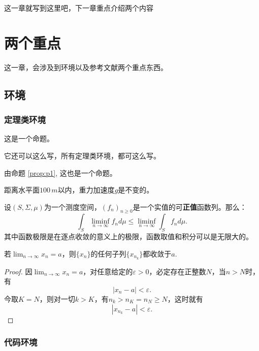 这一章就写到这里吧，下一章重点介绍两个内容

\chapter{两个重点}
这一章，会涉及到环境以及参考文献两个重点东西。

\section{环境}
\subsection{定理类环境}

\begin{proposition}\label{prop:p1}
这是一个命题。
\end{proposition}

它还可以这么写，所有定理类环境，都可这么写。

\begin{proposition}[命题名]
由命题 \ref{prop:p1}, 这也是一个命题。
\end{proposition}

\begin{assumption}
距离水平面$100\,m$以内，重力加速度$g$是不变的。
\end{assumption}

\begin{lemma}[法图引理]
设$(S,\Sigma,\mu)$为一个测度空间，$(f_n)_{n\geq 0}$是一个实值的可\textbf{正值}函数列。那么：
\[
\int_S \liminf_{n\rightarrow \infty} f_n d\mu \leqslant \liminf_{n\rightarrow \infty} \int_S f_n d\mu.
\]
其中函数极限是在逐点收敛的意义上的极限，函数取值和积分可以是无限大的。
\end{lemma}

\begin{theorem}
若$\lim_{n\rightarrow \infty} x_n = a$，则$\{x_n\}$的任何子列$\{x_{n_k}\}$都收敛于$a$.
\end{theorem}
\begin{proof}
因$\lim_{n\rightarrow \infty} x_n = a$，对任意给定的$\varepsilon > 0$，必定存在正整数$N$，当$n>N$时，有
\[
|x_n-a|<\varepsilon.
\]
今取$K=N$，则对一切$k>K$，有$n_k>n_K=n_N\geq N$，这时就有
\[
|x_{n_k} - a|<\varepsilon.
\]
\end{proof}

\subsection{代码环境}

